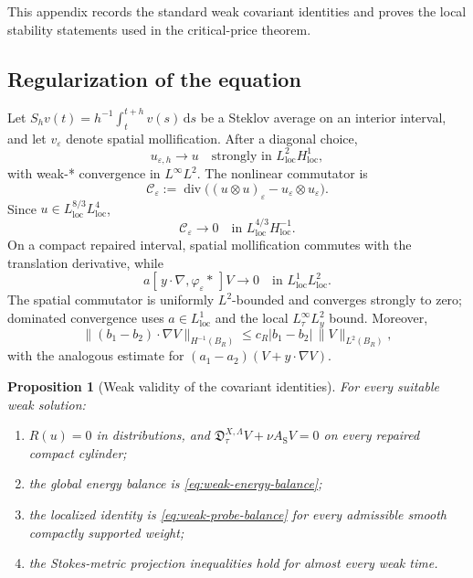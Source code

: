 \documentclass[11pt]{amsart}
\numberwithin{equation}{section}
\theoremstyle{plain}
\newtheorem{proposition}[proposition]{Proposition}
\theoremstyle{definition}
\theoremstyle{remark}
\newcommand{\dd}{\,\mathrm d}
\newcommand{\diver}{\operatorname{div}}
\newcommand{\Dcov}{\mathfrak D}
\begin{document}
This appendix records the standard weak covariant identities and proves the
local stability statements used in the critical-price theorem.

\subsection{Regularization of the equation}

Let \(S_hv(t)=h^{-1}\int_t^{t+h}v(s)\dd s\) be a Steklov average on an
interior interval, and let \(v_\varepsilon\) denote spatial mollification.
After a diagonal choice,
\begin{equation}\label{eq:regularization-convergence}
 u_{\varepsilon,h}\to u
 \quad\text{strongly in }L^2_{\mathrm{loc}}H^1_{\mathrm{loc}},
\end{equation}
with weak-* convergence in \(L^\infty L^2\).  The nonlinear commutator is
\begin{equation}\label{eq:nonlinear-commutator}
 \mathcal C_\varepsilon
 :=\diver\bigl((u\otimes u)_\varepsilon
              -u_\varepsilon\otimes u_\varepsilon\bigr).
\end{equation}
Since \(u\in L^{8/3}_{\mathrm{loc}}L^4_{\mathrm{loc}}\),
\begin{equation}\label{eq:commutator-convergence}
 \mathcal C_\varepsilon\to0
 \quad\text{in }L^{4/3}_{\mathrm{loc}}H^{-1}_{\mathrm{loc}}.
\end{equation}
On a compact repaired interval, spatial mollification commutes with the
translation derivative, while
\begin{equation}\label{eq:dilation-commutator}
 a[\,y\cdot\nabla,\varphi_\varepsilon*\,]V\to0
 \quad\text{in }L^1_{\mathrm{loc}}L^2_{\mathrm{loc}}.
\end{equation}
The spatial commutator is uniformly \(L^2\)-bounded and converges strongly to
zero; dominated convergence uses \(a\in L^1_{\mathrm{loc}}\) and the local
\(L^\infty_\tau L^2_y\) bound.  Moreover,
\[
 \|(b_1-b_2)\cdot\nabla V\|_{H^{-1}(B_R)}
 \le c_R|b_1-b_2|\,\|V\|_{L^2(B_R)},
\]
with the analogous estimate for
\((a_1-a_2)(V+y\cdot\nabla V)\).

\begin{proposition}[Weak validity of the covariant identities]
\label{prop:weak-covariant-identities}
For every suitable weak solution:
\begin{enumerate}[label=\textup{(\roman*)},leftmargin=2.2em]
\item \(R(u)=0\) in distributions, and
\(\Dcov_\tau^{X,\Lambda}V+\nu A_{\mathrm S}V=0\) on every repaired compact
cylinder;
\item the global energy balance is \eqref{eq:weak-energy-balance};
\item the localized identity is \eqref{eq:weak-probe-balance} for every
admissible smooth compactly supported weight;
\item the Stokes-metric projection inequalities hold for almost every weak time.
\end{enumerate}
\end{proposition}
\end{document}
